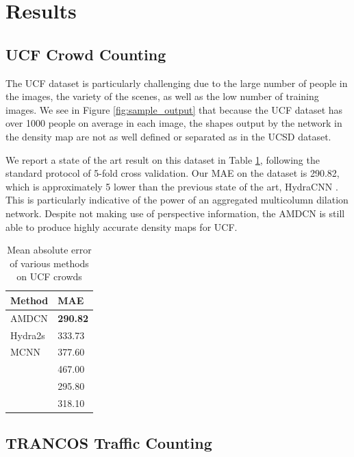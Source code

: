 \documentclass[10pt,twocolumn,letterpaper]{article}
\begin{document}
\section{Results}

\subsection{UCF Crowd Counting}\label{ucf_50}

The UCF dataset is particularly challenging due to the large number of people in the images, the variety of the scenes, as well as the low number of training images. We see in Figure \ref{fig:sample_output} that because the UCF dataset has over 1000 people on average in each image, the shapes output by the network in the density map are not as well defined or separated as in the UCSD dataset.

We report a state of the art result on this dataset in Table \ref{tab:ucf}, following the standard protocol of 5-fold cross validation. Our MAE on the dataset is 290.82, which is approximately 5 lower than the previous state of the art, HydraCNN \cite{rubio2016}. This is particularly indicative of the power of an aggregated multicolumn dilation network. Despite not making use of perspective information, the AMDCN is still able to produce highly accurate density maps for UCF.

\begin{table}
    \begin{center}
    \begin{tabular}{|p{3.5cm}|p{2.5cm}|}
        \hline
         \textbf{Method} & \textbf{MAE}\\\hline
         AMDCN & \textbf{290.82}\\\hline
         Hydra2s \cite{rubio2016} & 333.73\\\hline
         MCNN \cite{zhang2016single} & 377.60\\\hline
         \cite{zhang2015cross} & 467.00\\\hline
         \cite{sindagi2017generating} & 295.80\\\hline
         \cite{babu2017switching} & 318.10\\\hline
    \end{tabular}
    \end{center}
    \caption{Mean absolute error of various methods on UCF crowds}
    \label{tab:ucf}
\end{table}

\subsection{TRANCOS Traffic Counting}\label{trancos}
\end{document}
